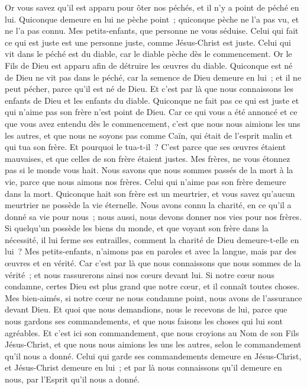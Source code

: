 \begin{multicols}{2}
Or vous savez qu'il est apparu pour ôter nos péchés, et il n'y a point de péché en lui.
Quiconque demeure en lui ne pèche point~; quiconque pèche ne l'a pas vu, et ne l'a pas connu.
Mes petits-enfants, que personne ne vous séduise. Celui qui fait ce qui est juste est une personne juste, comme Jésus-Christ est juste.
Celui qui vit dans le péché est du diable, car le diable pèche dès le commencement. Or le Fils de Dieu est apparu afin de détruire les œuvres du diable.
Quiconque est né de Dieu ne vit pas dans le péché, car la semence de Dieu demeure en lui~; et il ne peut pécher, parce qu'il est né de Dieu.
Et c'est par là que nous connaissons les enfants de Dieu et les enfants du diable. Quiconque ne fait pas ce qui est juste et qui n'aime pas son frère n'est point de Dieu.
Car ce qui vous a été annoncé et ce que vous avez entendu dès le commencement, c'est que nous nous aimions les uns les autres,
et que nous ne soyons pas comme Caïn, qui était de l'esprit malin et qui tua son frère. Et pourquoi le tua-t-il~? C'est parce que ses œuvres étaient mauvaises, et que celles de son frère étaient justes.
Mes frères, ne vous étonnez pas si le monde vous hait.
Nous savons que nous sommes passés de la mort à la vie, parce que nous aimons nos frères. Celui qui n'aime pas son frère demeure dans la mort.
Quiconque hait son frère est un meurtrier, et vous savez qu'aucun meurtrier ne possède la vie éternelle.
Nous avons connu la charité, en ce qu'il a donné sa vie pour nous~; nous aussi, nous devons donner nos vies pour nos frères.
Si quelqu'un possède les biens du monde, et que voyant son frère dans la nécessité, il lui ferme ses entrailles, comment la charité de Dieu demeure-t-elle en lui~?
Mes petits-enfants, n'aimons pas en paroles et avec la langue, mais par des œuvres et en vérité.
Car c'est par là que nous connaissons que nous sommes de la vérité~; et nous rassurerons ainsi nos cœurs devant lui.
Si notre cœur nous condamne, certes Dieu est plus grand que notre cœur, et il connaît toutes choses.
Mes bien-aimés, si notre cœur ne nous condamne point, nous avons de l'assurance devant Dieu.
Et quoi que nous demandions, nous le recevons de lui, parce que nous gardons ses commandements, et que nous faisons les choses qui lui sont agréables.
Et c'est ici son commandement, que nous croyions au Nom de son Fils Jésus-Christ, et que nous nous aimions les uns les autres, selon le commandement qu'il nous a donné.
Celui qui garde ses commandements demeure en Jésus-Christ, et Jésus-Christ demeure en lui~; et par là nous connaissons qu'il demeure en nous, par l'Esprit qu'il nous a donné.

\end{multicols}
